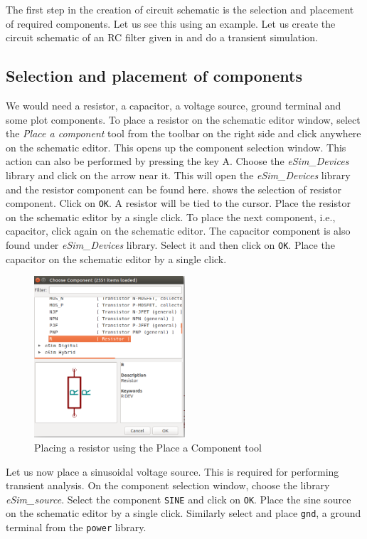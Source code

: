 The first step in the creation of circuit schematic is the selection
and placement of required components. Let  us  see  this  using  an  example.   Let  us  create  the  circuit schematic of an RC  filter given in  and do a transient simulation.  


\subsection{Selection and placement of components} 
\label{selplace}
We would need a resistor, a capacitor, a voltage source, ground
terminal and some plot components. To place a resistor on the schematic editor window, select the \textit{Place a component} tool from the toolbar on the right side and click
anywhere on the schematic editor. This opens up the component
selection window. This action can also be performed by pressing
the key A. Choose the \textit{eSim\_Devices} library and click on the arrow near it. This will open the \textit{eSim\_Devices} library and the resistor component can be found here.  shows the selection of resistor component. Click on {\tt OK}. A resistor will be tied to the cursor. Place the resistor on the
schematic editor by a single click. To place the next component, i.e., capacitor, click again on the schematic editor. The capacitor component is also found under \textit{eSim\_Devices} library. Select it and then click on {\tt OK}. Place the capacitor on the schematic editor by a single click.

\begin{figure}[h]
\centering
\includegraphics[width=0.5\textwidth]{resistor.png}
\caption{Placing a resistor using the Place a Component tool}
\label{resistor}
\end{figure}
 
Let us now place a sinusoidal voltage source. This is required for performing transient analysis. On the component selection window, choose the library \textit{eSim\_source}. Select the component {\tt SINE} and click on {\tt OK}. Place the sine source on the schematic editor by a single click. Similarly select and place {\tt gnd}, a ground terminal from the {\tt power} library. 

